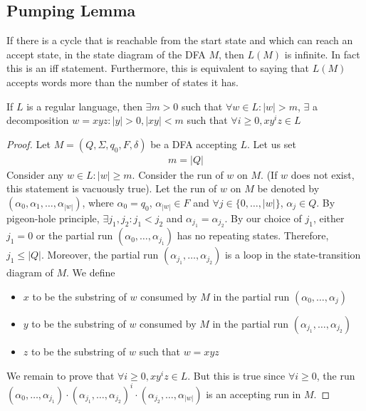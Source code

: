 \documentclass[a4paper]{article}
\theoremstyle{plain}
\theoremstyle{definition}
\newtheorem{defn}{Definition}[section]
\theoremstyle{remark}
\begin{document}
\subsection{Pumping Lemma}
\begin{tcolorbox}[colback=black!3!white,colframe=black!60!white,title=\begin{defn}Intuition\label{Pumping Lemma}\end{defn}]
If there is a cycle that is reachable from the start state and which can reach an accept state, in the state diagram of the DFA $M$, then $L(M)$ is infinite. In fact this is an iff statement. Furthermore, this is equivalent to saying that $L(M)$ accepts words more than the number of states it has.
\end{tcolorbox}
\begin{tcolorbox}[colback=black!3!white,colframe=black!60!white,title=\begin{defn}Pumping Lemma \label{Pumping Lemma}\end{defn}]
If $L$ is a regular language, then $\exists  m>0$ such that $\forall  w \in L : |w| > m$, $\exists $ a decomposition $w=xyz : |y|>0, |xy|<m$ such that $\forall  i\ge 0, xy^{i}z \in L$
\begin{proof}
	Let $M = (Q,\Sigma, q_0, F, \delta)$ be a DFA accepting $L$. Let us set
	\begin{align}
		m = |Q|
	\end{align}
	Consider any $w \in L : |w| \ge m$. Consider the run of $w$ on $M$. (If $w$ does not exist, this statement is vacuously true). Let the run of $w$ on $M$ be denoted by $(\alpha_0,\alpha_1,\ldots,\alpha_{|w|})$, where $\alpha_0 = q_0$, $\alpha_{|w|} \in F$ and $\forall  j \in \{0,\ldots,|w|\}$, $\alpha_j \in Q$. By pigeon-hole principle, $\exists j_1,j_2 : j_1<j_2$ and $\alpha_{j_1}=\alpha_{j_2}$. By our choice of $j_1$, either $j_1=0$ or the partial run $(\alpha_0,\ldots,\alpha_{j_1})$ has no repeating states. Therefore, $j_1 \le |Q|$. Moreover, the partial run $(\alpha_{j_1},\ldots,\alpha_{j_2})$ is a loop in the state-transition diagram of $M$. We define
	\begin{itemize}
		\item $x$ to be the substring of $w$ consumed by $M$ in the partial run $(\alpha_0,\ldots,\alpha_j)$
		\item $y$ to be the substring of $w$ consumed by $M$ in the partial run $(\alpha_{j_1},\ldots,\alpha_{j_2})$ 
		\item $z$ to be the substring of $w$ such that $w = xyz$
	\end{itemize}
	We remain to prove that $\forall  i\ge 0, xy^{i}z \in L$. But this is true since $\forall  i\ge 0$, the run $(\alpha_0,\ldots,\alpha_{j_1}) \cdot(\alpha_{j_1},\ldots,\alpha_{j_2})^{i}\cdot(\alpha_{j_2},\ldots,\alpha_{|w|})$ is an accepting run in $M$.
\end{proof}
\end{tcolorbox}
\end{document}
